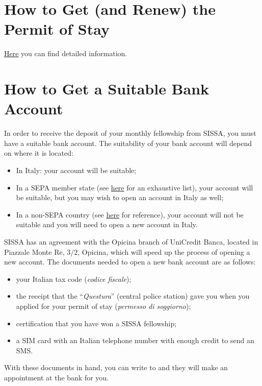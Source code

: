 \documentclass{sissavademecum}
\begin{document}
\section{How to Get (and Renew) the Permit of Stay}

\href{http://wiki.sissa.it/students/index.php/Permit_of_stay}{Here} you can find detailed information.


\section{How to Get a Suitable Bank Account}

In order to receive the deposit of your monthly fellowship from SISSA, you must have a suitable bank account. The suitability of your bank account will depend on where it is located:
\begin{itemize}
    \item In Italy: your account will be suitable;
    \item In a SEPA member state (see \href{https://www.ecb.europa.eu/paym/integration/retail/sepa/html/index.en.html}{here} for an exhaustive list), your account will be suitable, but you may wish to open an account in Italy as well;
    \item In a non-SEPA country (see \href{https://www.ecb.europa.eu/paym/integration/retail/sepa/html/index.en.html}{here} for reference), your account will not be suitable and you will need to open a new account in Italy.
\end{itemize}

SISSA has an agreement with the Opicina branch of UniCredit Banca, located in Piazzale Monte Re, $3/2$, Opicina, which will speed up the process of opening a new account. The documents needed to open a new bank account are as follows:
\begin{itemize}
    \item your Italian tax code (\textit{codice fiscale});
    \item the receipt that the ``\textit{Questura}'' (central police station) gave you when you applied for your permit of stay (\textit{permesso di soggiorno});
    \item certification that you have won a SISSA fellowship;
    \item a SIM card with an Italian telephone number with enough credit to send an SMS.
\end{itemize}

With these documents in hand, you can write to  and they will make an appointment at the bank for you.
\end{document}
